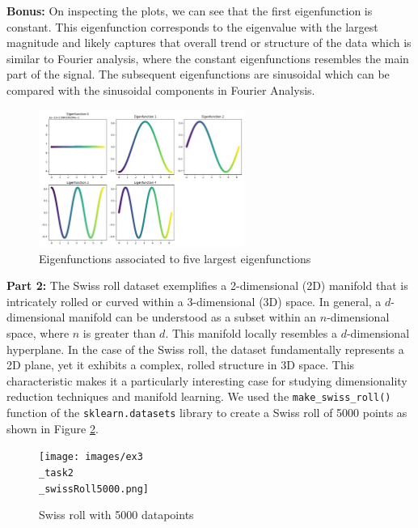 \textbf{Bonus: } On inspecting the plots, we can see that the first eigenfunction is constant. This eigenfunction corresponds to the eigenvalue with the largest magnitude and likely captures that overall trend or structure of the data which is similar to Fourier analysis, where the constant eigenfunctions resembles the main part of the signal. The subsequent eigenfunctions are sinusoidal which can be compared with the sinusoidal components in Fourier Analysis.\\
\begin{figure}[h]
    \centering
    \includegraphics[width=0.6\textwidth]{images/ex2task1-1-2.png}
    \caption{Eigenfunctions associated to five largest eigenfunctions}
    \label{fig:eigenvalues_plotted}
\end{figure}




\textbf{Part 2:} The Swiss roll dataset exemplifies a 2-dimensional (2D) manifold that is intricately rolled or curved within a 3-dimensional (3D) space. In general, a \( d \)-dimensional manifold can be understood as a subset within an \( n \)-dimensional space, where \( n \) is greater than \( d \). This manifold locally resembles a \( d \)-dimensional hyperplane. In the case of the Swiss roll, the dataset fundamentally represents a 2D plane, yet it exhibits a complex, rolled structure in 3D space. This characteristic makes it a particularly interesting case for studying dimensionality reduction techniques and manifold learning. We used the \texttt{make\_swiss\_roll()} function of the \texttt{sklearn.datasets} library to create a Swiss roll of 5000 points as shown in Figure \ref{fig:swiss_roll_5000}.\\

\begin{figure}[H]
    \centering
    \texttt{[image: images/ex3\\\_task2\\\_swissRoll5000.png]}
    \caption{Swiss roll with 5000 datapoints}
    \label{fig:swiss_roll_5000}
\end{figure}

